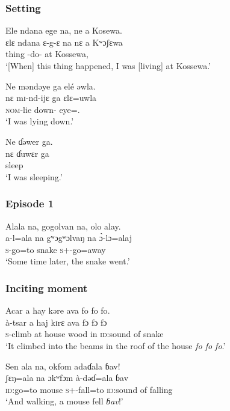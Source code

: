 \subsubsection*{Setting}
\ea
Ele  ndana  ege  na,  ne  a Kosewa.\\
\gll ɛlɛ     ndana  ɛ-g-ɛ    na    nɛ   a Kʷɔʃɛwa\\
thing {\DEM}    {\SSS-do{}-\CL}  {\PSP}     {\oneS}  at  Kossewa,\\
\glt ‘[When] this thing happened, I was [living] at Kossewa.’\\
\z

\noindent\parbox{\textwidth}{\ea
Ne məndəye  ga  elé  əwla.\\
\gll nɛ  mɪ-nd-ijɛ    ga  ɛlɛ=uwla\\
{\oneS}  {\textsc{nom}-lie down-{\CL}}   {\ADJ}   eye=\oneS.{\POSS}  \\
\glt ‘I was lying down.’
\z}

\ea 
Ne ɗəwer ga.\\
\gll nɛ   ɗuwɛr  ga\\
{\oneS}   sleep    {\ADJ} \\
\glt ‘I was sleeping.’
\z

\subsubsection*{Episode 1}
\ea 
 Alala  na, gogolvan  na, olo  alay.\\
\gll a-l=ala na gʷɔgʷɔlvaŋ   na \`ɔ{}-lɔ=alaj\\
\textsc{s}-go=to       {\PSP}  snake      {\PSP}   \textsc{s}+{\PFV}-go=away\\
\glt ‘Some time later, the snake went.’
\z

\subsubsection*{Inciting moment}
\ea
 Acar  a  hay  kəre  ava  {fo fo fo}.\\
\gll à-tsar  a  haj  kɪrɛ  ava  {fɔ fɔ fɔ}\\
\textsc{s}-climb at house   wood      in {\textsc{id}:sound of snake}\\
\glt ‘It climbed into the beams in the roof of the house \textit{fo fo fo}.’
\z

\newpage 
\ea 
 Sen  ala  na,  okfom  adaɗala   ɓav!\\
\gll ʃɛŋ=ala     na ɔkʷfɔm   à-dəɗ=ala   ɓav\\
\textsc{id}:go=to      {\PSP}   mouse  \textsc{s}+{\PFV}-fall=to     {\textsc{id}:sound of falling} \\
\glt ‘And walking, a mouse fell \textit{ɓav}!’
\z


